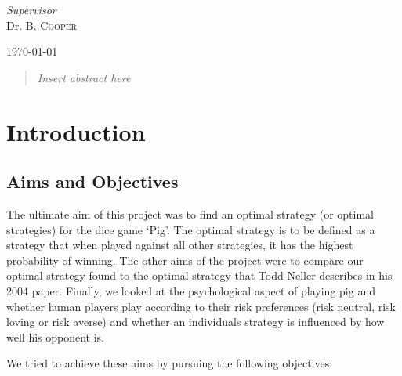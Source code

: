 \documentclass[a4paper,titlepage]{article}
\begin{document}
\begin{titlepage}
	\vfill\vfill
	\textit{Supervisor}\\
	Dr. B. \textsc{Cooper}


	\vfill\vfill\vfill

	{\large\today}
	\vfill


	\newpage
	\begin{abstract}
	\textit{Insert abstract here}
	\end{abstract}
\end{titlepage}


\tableofcontents
\newpage

\section{Introduction}

\subsection{Aims and Objectives}
The ultimate aim of this project was to find an optimal strategy (or optimal strategies) for the dice game ‘Pig’. The optimal strategy is to be defined as a strategy that when played against all other strategies, it has the highest probability of winning. The other aims of the project were to compare our optimal strategy found to the optimal strategy that Todd Neller describes in his 2004 paper\cite{neller2004optimal}. Finally, we looked at the psychological aspect of playing pig and whether human players play according to their risk preferences (risk neutral, risk loving or risk averse) and whether an individuals strategy is influenced by how well his opponent is.

We tried to achieve these aims by pursuing the following objectives:
\end{document}
